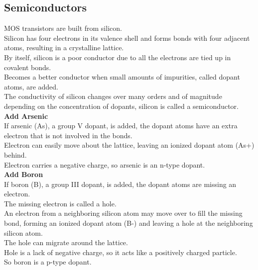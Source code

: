 \documentclass[12pt]{article}
\theoremstyle{definition}
\begin{document}
  \subsection{Semiconductors}
  MOS transistors are built from silicon. \\
  Silicon has four electrons in its valence shell and forms bonds with four adjacent atoms, resulting in a crystalline lattice. \\
  By itself, silicon is a poor conductor due to all the electrons are tied up in covalent bonds. \\
  Becomes a better conductor when small amounts of impurities, called dopant atoms, are added. \\
  The conductivity of silicon changes over many orders and of magnitude depending on the concentration of dopants, silicon is called a semiconductor. \\
  \textbf{Add Arsenic} \\
  If arsenic (As), a group V dopant, is added, the dopant atoms have an extra electron that is not involved in the bonds. \\
  Electron can easily move about the lattice, leaving an ionized dopant atom (As+) behind. \\
  Electron carries a negative charge, so arsenic is an n-type dopant. \\
  \textbf{Add Boron} \\
  If boron (B), a group III dopant, is added, the dopant atoms are missing an electron. \\
  The missing electron is called a hole. \\
  An electron from a neighboring silicon atom may move over to fill the missing bond, forming an ionized dopant atom (B-) and leaving a hole at the neighboring silicon atom. \\
  The hole can migrate around the lattice. \\
  Hole is a lack of negative charge, so it acts like a positively charged particle. \\
  So boron is a p-type dopant.
\end{document}
